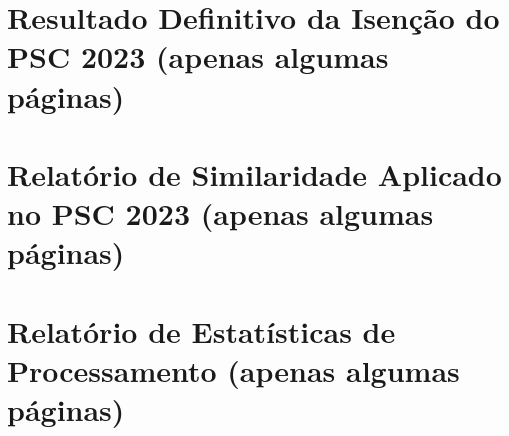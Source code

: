 \documentclass[
	12pt,			%
	openright,		%
	oneside,	
	a4paper,		%
	english,		%
	brazil			%
]{abntex2/abntex2}  %
\begin{document}
	\begin{anexosenv}
		
		\chapter{Resultado Definitivo da Isenção do PSC 2023 (apenas algumas páginas)}
		
		
		\chapter{Relatório de Similaridade Aplicado no PSC 2023 (apenas algumas páginas)}
		
		
		\chapter{Relatório de Estatísticas de Processamento (apenas algumas páginas)}
		
		
	\end{anexosenv}
\end{document}
